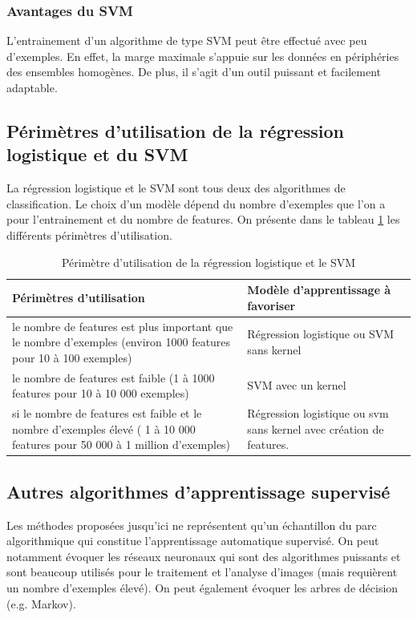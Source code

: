 \subsubsection{Avantages du SVM}
\label{Le Machine Learning: Les différents algorithmes: SVM: Avantage du SVM}
L'entrainement d'un algorithme de type SVM peut être effectué avec peu d'exemples. En effet, la marge maximale s'appuie sur les données en périphéries des ensembles homogènes. De plus, il s'agit d'un outil puissant et facilement adaptable.

\subsection{Périmètres d'utilisation de la régression logistique et du SVM}
\label{Le Machine Learning: Choix de la méthode à utiliser: Comparaison de la régression logistique et le SVM}
La régression logistique et le SVM sont tous deux des algorithmes de classification. Le choix d'un modèle dépend du nombre d'exemples que l'on a pour l'entrainement et du nombre de features. On présente dans le tableau \ref {tab:Périmètre d'utilisation de la régression logistique et le SVM} les différents périmètres d'utilisation.

\begin{table}[h]
	\begin{tabular}{ | p{7cm} | p{7cm} |}
		\hline
		Périmètres d'utilisation & Modèle d'apprentissage à favoriser \\
		\hline 
		le nombre de features est plus important que le nombre d'exemples (environ 1000 features pour 10 à 100 exemples) & Régression logistique ou SVM sans kernel \\
		\hline
		le nombre de features est faible (1 à 1000 features pour 10 à 10 000 exemples) & SVM avec un kernel \\
		\hline 
		si le nombre de features est faible et le nombre d'exemples élevé ( 1 à 10 000 features pour 50 000 à 1 million d'exemples) & Régression logistique ou svm sans kernel avec création de features. \\
		\hline
	\end{tabular}
	\caption[Périmètre d'utilisation de la régression logistique et le SVM]{Périmètre d'utilisation de la régression logistique et le SVM}
	\label {tab:Périmètre d'utilisation de la régression logistique et le SVM}
\end{table}

\subsection{Autres algorithmes d'apprentissage supervisé}
\label{Le Machine Learning: Choix de la méthode à utiliser: Autres algorithmes pour l'apprentissage supervisé}
Les méthodes proposées jusqu'ici ne représentent qu'un échantillon du parc algorithmique qui constitue l'apprentissage automatique supervisé. On peut notamment évoquer les réseaux neuronaux qui sont des algorithmes puissants et sont beaucoup utilisés pour le traitement et l'analyse d'images (mais requièrent un nombre d'exemples élevé). On peut également évoquer les arbres de décision (e.g. Markov).